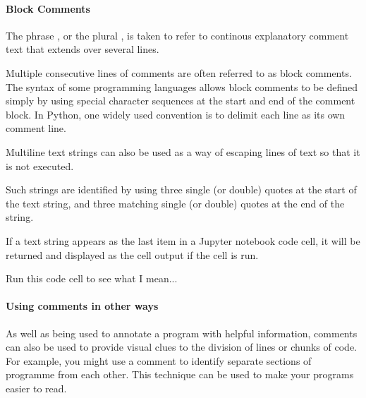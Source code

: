 \documentclass[letterpaper,10pt,english]{sphinxmanual}
\begin{document}
\paragraph{Block Comments}
\label{\detokenize{content/01_Robot_Lab/Section_00_01:Block-Comments}}
The phrase , or the plural , is taken to refer to continous explanatory comment text that extends over several lines.

{
\begin{sphinxVerbatim}[commandchars=\\\{\}]
\llap{\color{nbsphinxin}[ ]:\,\hspace{\fboxrule}\hspace{\fboxsep}}\PYGZsh{} Multiple consecutive lines of comments are often referred to
\PYGZsh{} as \PYGZdq{}block comments\PYGZdq{}.
\PYGZsh{}
\PYGZsh{} The syntax of some programming languages allows block comments to be defined
\PYGZsh{} simply by using special character sequences at the start and end of the comment block.
\PYGZsh{}
\PYGZsh{} In Python, one widely used convention is to delimit each line as its own comment line.

\PYGZsq{}\PYGZsq{}\PYGZsq{}
Multi\PYGZhy{}line text strings can also be used as a way of \PYGZdq{}escaping\PYGZdq{} lines of text
so that it is not executed.

Such strings are identified by using three single (or double) quotes at the start of the
text string, and three matching single (or double) quotes at the end of the string.

If a text string appears as the last item in a Jupyter notebook code cell,
it will be returned and displayed as the cell output if the cell is run.

Run this code cell to see what I mean...
\PYGZsq{}\PYGZsq{}\PYGZsq{}
\end{sphinxVerbatim}
}


\paragraph{Using comments in other ways}
\label{\detokenize{content/01_Robot_Lab/Section_00_01:Using-comments-in-other-ways}}
As well as being used to annotate a program with helpful information, comments can also be used to provide visual clues to the division of lines or chunks of code. For example, you might use a comment to identify separate sections of programme from each other. This technique can be used to make your programs easier to read.
\end{document}
